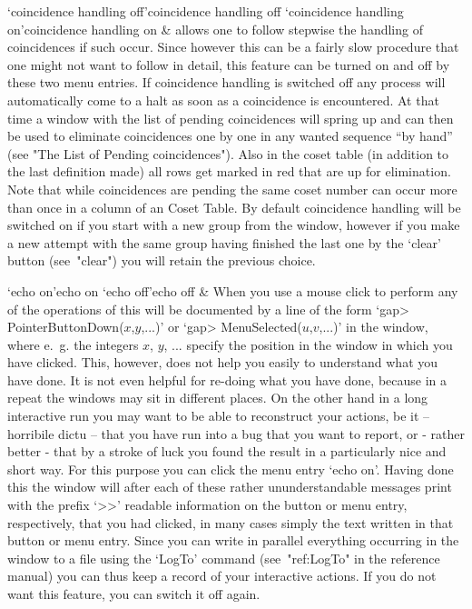 \beginitems

\>`coincidence handling off'{coincidence handling off}
\>`coincidence handling on'{coincidence handling on} &
  {\ITC} allows one to follow stepwise the handling of coincidences if such
  occur. Since however this can be a fairly slow procedure that one
  might not want to follow in detail, this feature can be turned on and
  off by these two menu entries. If coincidence handling is switched
  off any process will automatically come to a halt as soon as a
  coincidence is encountered. At that time a window with the list of
  pending coincidences will spring up and can then be used to eliminate
  coincidences one by one in any wanted sequence ``by hand'' (see "The
  List of Pending coincidences"). Also in the coset table (in addition
  to the last definition made) all rows get marked in red that are up
  for elimination. Note that while coincidences are pending the same
  coset number can occur more than once in a column of an {\ITC} Coset
  Table. By default coincidence handling will be switched on if you
  start with a new group from the {\GAP} window, however if you make a
  new attempt with the same group having finished the last one by the
  `clear' button (see~"clear") you will retain the previous choice.

\>`echo on'{echo on}
\>`echo off'{echo off} &
  When you use a mouse click to perform any of the operations of {\ITC}
  this will be documented by a line of the form `gap>
  PointerButtonDown($x$,$y$,...)' or `gap> MenuSelected($u$,$v$,...)'
  in the {\GAP} window, where e.~g. the integers $x$, $y$, ... specify
  the position in the window in which you have clicked. This,
  however, does not help you easily to understand what you have done. It
  is not even helpful for re-doing what you have done, because in a
  repeat the windows may sit in different places. On the other hand in
  a long interactive run you may want to be able to reconstruct your
  actions, be it -- horribile dictu -- that you have run into a bug that
  you want to report, or - rather better - that by a stroke of luck you
  found the result in a particularly nice and short way. For this
  purpose you can click the menu entry `echo on'. Having done this
  the {\GAP} window will after each of these rather ununderstandable
  messages print with the prefix `>>' readable information on the button
  or menu entry, respectively, that you had clicked, in many cases
  simply the text written in that button or menu entry. Since you can
  write in parallel everything occurring in the {\GAP} window to a file
  using the `LogTo' command (see~"ref:LogTo" in the {\GAP} reference
  manual) you can thus keep a record of your interactive actions. If
  you do not want this feature, you can switch it off again.

